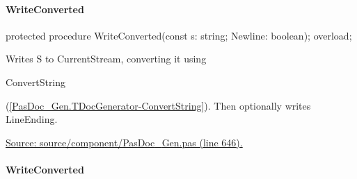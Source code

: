 \documentclass{report}
\newif\ifpdf
\begin{document}
\paragraph*{WriteConverted}\hspace*{\fill}

\label{PasDoc_Gen.TDocGenerator-WriteConverted}
\begin{list}{}{
\setlength{\itemindent}{0cm}
\setlength{\listparindent}{0cm}
\setlength{\leftmargin}{\evensidemargin}
\addtolength{\leftmargin}{\tmplength}
\settowidth{\labelsep}{X}
\addtolength{\leftmargin}{\labelsep}
\setlength{\labelwidth}{\tmplength}
}
\item[\textbf{Declaration}\hfill]
\ifpdf
\begin{flushleft}
\fi
\begin{ttfamily}
protected procedure WriteConverted(const s: string; Newline: boolean); overload;\end{ttfamily}

\ifpdf
\end{flushleft}
\fi

\par
\item[\textbf{Description}]
Writes S to CurrentStream, converting it using \begin{ttfamily}ConvertString\end{ttfamily}(\ref{PasDoc_Gen.TDocGenerator-ConvertString}). Then optionally writes LineEnding.\par
\href{https://github.com/pasdoc/pasdoc/blob/master/source/component/PasDoc_Gen.pas#L646}{Source: source/component/PasDoc{\_}Gen.pas (line 646).}

\end{list}
\paragraph*{WriteConverted}\hspace*{\fill}
\end{document}
